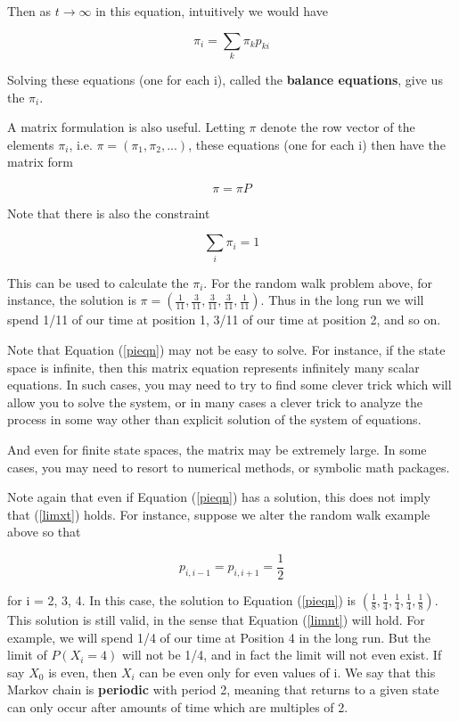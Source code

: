 \documentclass[11pt]{article}
\begin{document}
Then as $t\rightarrow \infty $ in this equation, intuitively we
would have  

\begin{equation}
\pi_{i}=\sum_{k}\pi_{k}p_{ki}
\end{equation}

Solving these equations (one for each i), called the {\bf balance
equations}, give us the $\pi_i$.

A matrix formulation is also useful.  Letting $\pi $ denote the row
vector of the elements $\pi_{i}$, i.e.  $\pi = (\pi_1, \pi_2, ...)$,
these equations (one for each i) then have the matrix form

\begin{equation}
\label{pieqn}
\pi =\pi P
\end{equation}

Note that there is also the constraint

\begin{equation}
\sum_{i}\pi_{i}=1
\end{equation}

This can be used to calculate the $\pi_{i}$. For the random walk
problem above, for instance, the solution is $\pi
=(\frac{1}{11},\frac{3}{11},\frac{3}{11},\frac{3}{11},\frac{1}{11})$.
Thus in the long run we will spend 1/11 of our time at position 1, 3/11
of our time at position 2, and so on.

Note that Equation (\ref{pieqn}) may not be easy to solve. For instance,
if the state space is infinite, then this matrix equation represents
infinitely many scalar equations.  In such cases, you may need to try to
find some clever trick which will allow you to solve the system, or in
many cases a clever trick to analyze the process in some way other than
explicit solution of the system of equations.

And even for finite state spaces, the matrix may be extremely large.  In
some cases, you may need to resort to numerical methods, or symbolic
math packages.  

Note again that even if Equation (\ref{pieqn}) has a solution, this does
not imply that (\ref{limxt}) holds. For instance, suppose we alter the
random walk example above so that

\begin{equation}
p_{i,i-1}=p_{i,i+1}=\frac{1}{2}
\end{equation}  

for i = 2, 3, 4. In this case, the solution to Equation (\ref{pieqn}) is
$(\frac{1}{8},\frac{1}{4},\frac{1}{4},\frac{1}{4},\frac{1}{8})$.  This
solution is still valid, in the sense that Equation (\ref{limnt}) will
hold. For example, we will spend 1/4 of our time at Position 4 in the
long run.  But the limit of $P(X_{i}=4)$ will not be 1/4, and in fact
the limit will not even exist. If say $X_{0}$ is even, then $X_{i}$ can
be even only for even values of i.  We say that this Markov chain is
{\bf periodic} with period 2, meaning that returns to a given state can
only occur after amounts of time which are multiples of 2.
\end{document}
